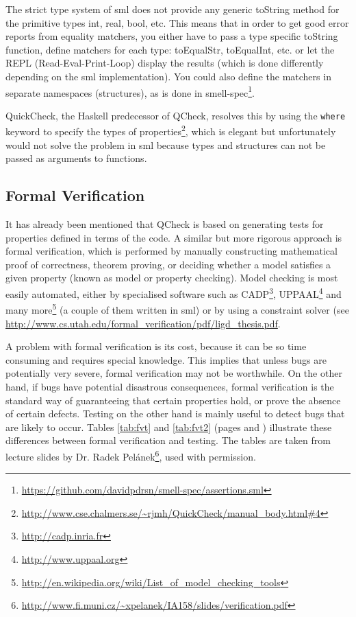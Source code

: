 \documentclass[11pt]{article}
\begin{document}
The strict type system of \gls{sml} does not provide any generic toString method for the primitive types int, real, bool, etc. This means that in order to get good error reports from equality \glspl{matcher}, you either have to pass a type specific toString function, define \glspl{matcher} for each type: toEqualStr, toEqualInt, etc. or let the REPL (Read-Eval-Print-Loop) display the results (which is done differently depending on the \gls{sml} implementation). You could also define the \glspl{matcher} in separate namespaces (structures), as is done in smell-spec\footnote{\url{https://github.com/davidpdrsn/smell-spec/assertions.sml}}.

QuickCheck, the Haskell predecessor of QCheck, resolves this by using the \texttt{where} keyword to specify the types of properties\footnote{\url{http://www.cse.chalmers.se/~rjmh/QuickCheck/manual\_body.html\#4}}, which is elegant but unfortunately would not solve the problem in \gls{sml} because types and structures can not be passed as arguments to functions. %

\subsection{Formal Verification}
\label{subsec:formalverification}

It has already been mentioned that QCheck is based on generating tests for properties defined in terms of the code. A similar but more rigorous approach is formal verification, which is performed by manually constructing mathematical proof of correctness, theorem proving, or deciding whether a model satisfies a given property (known as model or property checking). Model checking is most easily automated, either by specialised software such as CADP\footnote{\url{http://cadp.inria.fr}}, UPPAAL\footnote{\url{http://www.uppaal.org}} and many more\footnote{\url{http://en.wikipedia.org/wiki/List_of_model_checking_tools}} (a couple of them written in \gls{sml}) or by using a constraint solver (see \url{http://www.cs.utah.edu/formal\_verification/pdf/ligd\_thesis.pdf}. %

A problem with formal verification is its cost, because it can be so time consuming and requires special knowledge. This implies that unless bugs are potentially very severe, formal verification may not be worthwhile. On the other hand, if bugs have potential disastrous consequences, formal verification is the standard way of guaranteeing that certain properties hold, or prove the absence of certain defects. Testing on the other hand is mainly useful to detect bugs that are likely to occur. Tables \ref{tab:fvt} and \ref{tab:fvt2} (pages \pageref{tab:fvt} and \pageref{tab:fvt2}) illustrate these differences between formal verification and testing. The tables are taken from lecture slides by Dr. Radek Pelánek\footnote{\url{http://www.fi.muni.cz/~xpelanek/IA158/slides/verification.pdf}}, used with permission.
\end{document}
